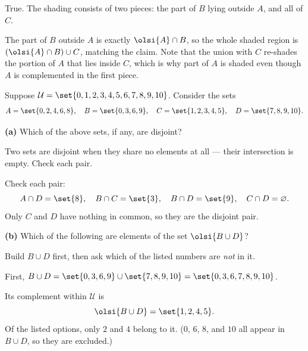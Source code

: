 \documentclass[12pt]{ximera}
\begin{document}
\begin{problem}
\begin{prompt}
\begin{solution}
True. The shading consists of two pieces: the part of $B$ lying outside $A$, and all
of $C$.

The part of $B$ outside $A$ is exactly $\olsi{A}\cap B$, so the whole shaded region
is $\left(\olsi{A}\cap B\right)\cup C$, matching the claim. Note that the union with
$C$ re-shades the portion of $A$ that lies inside $C$, which is why part of $A$ is
shaded even though $A$ is complemented in the first piece.
\end{solution}
\end{prompt}
\end{problem}

\begin{problem}
Suppose $\mathcal{U}=\set{0,1,2,3,4,5,6,7,8,9,10}$. Consider the sets
\[
A= \set{0,2,4,6,8},\quad B= \set{0,3,6,9},\quad C= \set{1,2,3,4,5},\quad D= \set{7,8,9,10}.
\]

\begin{prompt}
\textbf{(a)} Which of the above sets, if any, are disjoint?

\begin{multipleChoice}
\end{multipleChoice}

\begin{hint}
Two sets are disjoint when they share no elements at all --- their intersection is
empty. Check each pair.
\end{hint}

\begin{solution}
Check each pair:
\[
A\cap D=\set{8},\quad B\cap C=\set{3},\quad B\cap D=\set{9},\quad C\cap D=\varnothing.
\]
Only $C$ and $D$ have nothing in common, so they are the disjoint pair.
\end{solution}
\end{prompt}

\begin{prompt}
\textbf{(b)} Which of the following are elements of the set $\olsi{B\cup D}$?

\begin{selectAll}
\end{selectAll}

\begin{hint}
Build $B\cup D$ first, then ask which of the listed numbers are \emph{not} in it.
\end{hint}

\begin{solution}
First, $B\cup D=\set{0,3,6,9}\cup\set{7,8,9,10}=\set{0,3,6,7,8,9,10}$.

Its complement within $\mathcal{U}$ is
\[ \olsi{B\cup D}=\set{1,2,4,5}. \]
Of the listed options, only $2$ and $4$ belong to it. ($0$, $6$, $8$, and $10$ all
appear in $B\cup D$, so they are excluded.)
\end{solution}
\end{prompt}
\end{problem}
\end{document}
